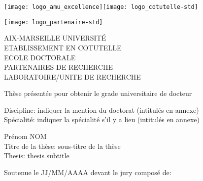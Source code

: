 \titlepage{}\selectfont{}
\vspace*{-2cm}
\begin{center}
	\begin{minipage}[c]{0.70\linewidth}
		\raggedright\texttt{[image: logo\_amu\_excellence]}\quad\texttt{[image: logo\_cotutelle-std]}
	\end{minipage}\hfill
	\begin{minipage}[c]{0.30\linewidth}
		\raggedleft\texttt{[image: logo\_partenaire-std]}
	\end{minipage}\hfill
\end{center}
\begin{flushleft}
	\vspace{0.2cm}
	\LARGE AIX-MARSEILLE UNIVERSITÉ\\
	\LARGE\textcolor{black!50}{ETABLISSEMENT EN COTUTELLE}\\
	\Large ECOLE DOCTORALE\\
	\vspace{0.2cm}
	\normalsize\textcolor{black!50}{PARTENAIRES DE RECHERCHE}\\
	\vspace{0.2cm}
	LABORATOIRE/UNITE DE RECHERCHE\\
    \begin{center}
		\vspace{1.8cm}
		Thèse présentée pour obtenir le grade universitaire de docteur\\
    \end{center}
	\vspace{0.5cm}
    Discipline: indiquer la mention du doctorat (intitulés en annexe)\\
    Spécialité: indiquer la spécialité s'il y a lieu (intitulés en annexe)\\
    \begin{center}
        \vspace{0.5cm}
        \Large Prénom NOM\\
        \vspace{1cm}
				\large Titre de la thèse: sous-titre de la thèse\\
				\vspace{0.5cm}
				\normalsize Thesis: thesis subtitle\\
    \end{center}
	\vspace{3.4cm}
    \normalsize Soutenue le JJ/MM/AAAA devant le jury composé de:\\
\end{flushleft}
